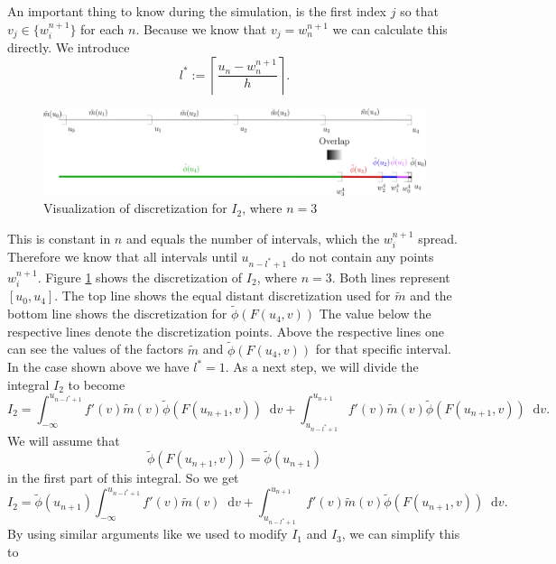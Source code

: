 \documentclass[12pt,a4paper,twoside, open=right]{scrreprt}
\theoremstyle{definition}
\theoremstyle{plain}
\newcommand{\D}{\mathop{}\!\mathrm{d}}
\begin{document}
\par An important thing to know during the simulation, is the first index $j$ so that $v_j\in\{w_i^{n+1}\}$ for each $n$. Because we know that $v_j = w_{n}^{n+1}$ we can calculate this directly. We introduce 
\begin{equation}
    l^*:=\left\lceil  \frac{u_n -w_{n}^{n+1}}{h}\right\rceil.
\end{equation}
\begin{figure}
    \centering
    \includegraphics[width=\textwidth]{Tranformls1}
    \caption{Visualization of discretization for $I_2$, where $n=3$}
    \label{fig:vis1}
\end{figure}
 This is constant in $n$ and equals the number of intervals, which the $w_i^{n+1}$ spread. Therefore we know that all intervals until $u_{n-l^*+1}$ do not contain any points $w_i^{n+1}$.
 Figure \ref{fig:vis1} shows the discretization of $I_2$, where $n=3$. Both lines represent $[u_0,u_4]$. The top line shows the equal distant discretization used for $\tilde{m}$ and the bottom line shows the discretization for $\tilde\phi(F(u_{4},v))$ The value below the respective lines denote the discretization points. Above the respective lines one can see the values of the factors $\tilde{m}$ and $\tilde\phi(F(u_4,v))$ for that specific interval. In the case shown above we have $l^*=1$. As a next step, we will divide the integral $I_2$ to become
\begin{equation}
    I_2 = \int_{-\infty}^{u_{n-l^*+1}}f'(v)\tilde{m}(v)\tilde{\phi}(F(u_{n+1},v))\D v + \int_{u_{n-l^* +1}}^{u_{n+1}}f'(v)\tilde{m}(v)\tilde{\phi}(F(u_{n+1},v))\D v.
\end{equation}
We will assume that \begin{equation}
    \tilde\phi(F(u_{n+1},v))=\tilde\phi(u_{n+1})
\end{equation}
in the first part of this integral. So we get 
\begin{equation}
    I_2 = \tilde\phi(u_{n+1})\int_{-\infty}^{u_{n-l^*+1}}f'(v)\tilde{m}(v)\D v+ \int_{u_{n-l^* +1}}^{u_{n+1}}f'(v)\tilde{m}(v)\tilde{\phi}(F(u_{n+1},v))\D v.
\end{equation}
By using similar arguments like we used to modify $I_1$ and $I_3$, we can simplify this to 
\end{document}
